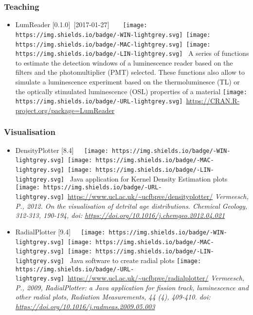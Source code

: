 \documentclass[]{article}
\providecommand{\tightlist}{%
  \setlength{\itemsep}{0pt}\setlength{\parskip}{0pt}}
\begin{document}
\hypertarget{teaching}{%
\subsubsection{Teaching}\label{teaching}}

\begin{itemize}
\tightlist
\item
  LumReader {[}0.1.0{]}~{[}2017-01-27{]}~~~~\texttt{[image: https://img.shields.io/badge/-WIN-lightgrey.svg]}~\texttt{[image: https://img.shields.io/badge/-MAC-lightgrey.svg]}~\texttt{[image: https://img.shields.io/badge/-LIN-lightgrey.svg]}~
  A series of functions to estimate the detection windows of a luminescence reader based on the filters and the photomultiplier (PMT) selected. These functions also allow to simulate a luminescence experiment based on the thermoluminesce (TL) or the optically stimulated luminescence (OSL) properties of a material
  \texttt{[image: https://img.shields.io/badge/-URL-lightgrey.svg]}~\url{https://CRAN.R-project.org/package=LumReader}
\end{itemize}

\hypertarget{visualisation}{%
\subsubsection{Visualisation}\label{visualisation}}

\begin{itemize}
\tightlist
\item
  DensityPlotter {[}8.4{]}~~~\texttt{[image: https://img.shields.io/badge/-WIN-lightgrey.svg]}~\texttt{[image: https://img.shields.io/badge/-MAC-lightgrey.svg]}~\texttt{[image: https://img.shields.io/badge/-LIN-lightgrey.svg]}~
  Java application for Kernel Density Estimation plots
  \texttt{[image: https://img.shields.io/badge/-URL-lightgrey.svg]}~\url{https://www.ucl.ac.uk/~ucfbpve/densityplotter/}
  \emph{Vermeesch, P., 2012. On the visualisation of detrital age distributions. Chemical Geology, 312-313, 190-194, doi: \url{https://doi.org/10.1016/j.chemgeo.2012.04.021}}
\item
  RadialPlotter {[}9.4{]}~~~\texttt{[image: https://img.shields.io/badge/-WIN-lightgrey.svg]}~\texttt{[image: https://img.shields.io/badge/-MAC-lightgrey.svg]}~\texttt{[image: https://img.shields.io/badge/-LIN-lightgrey.svg]}~
  Java software to create radial plots
  \texttt{[image: https://img.shields.io/badge/-URL-lightgrey.svg]}~\url{https://www.ucl.ac.uk/~ucfbpve/radialplotter/}
  \emph{Vermeesch, P., 2009, RadialPlotter: a Java application for fission track, luminescence and other radial plots, Radiation Measurements, 44 (4), 409-410. doi: \url{https://doi.org/10.1016/j.radmeas.2009.05.003}}
\end{itemize}
\end{document}
